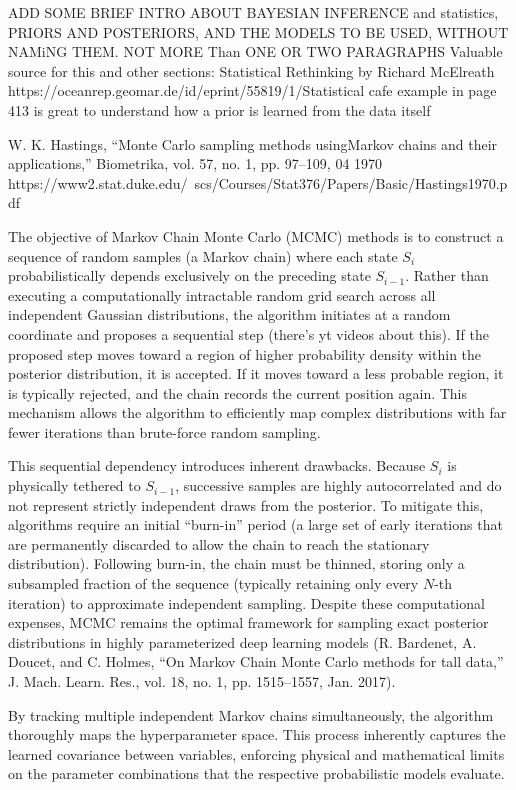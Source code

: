 \iffalse
ADD SOME BRIEF INTRO ABOUT BAYESIAN INFERENCE and statistics, PRIORS AND POSTERIORS, AND THE MODELS TO BE USED, WITHOUT NAMiNG THEM. NOT MORE Than ONE OR TWO PARAGRAPHS
Valuable source for this and other sections: Statistical Rethinking by Richard McElreath https://oceanrep.geomar.de/id/eprint/55819/1/Statistical%
cafe example in page 413 is great to understand how a prior is learned from the data itself


W. K. Hastings, “Monte Carlo sampling methods usingMarkov chains and their applications,” Biometrika, vol. 57, no. 1, pp. 97–109, 04 1970 https://www2.stat.duke.edu/~scs/Courses/Stat376/Papers/Basic/Hastings1970.pdf


The objective of Markov Chain Monte Carlo (MCMC) methods is to construct a sequence of random samples (a Markov chain) where each state $S_i$ probabilistically depends exclusively on the preceding state $S_{i-1}$. Rather than executing a computationally intractable random grid search across all independent Gaussian distributions, the algorithm initiates at a random coordinate and proposes a sequential step (there's yt videos about this). If the proposed step moves toward a region of higher probability density within the posterior distribution, it is accepted. If it moves toward a less probable region, it is typically rejected, and the chain records the current position again. This mechanism allows the algorithm to efficiently map complex distributions with far fewer iterations than brute-force random sampling.

This sequential dependency introduces inherent drawbacks. Because $S_i$ is physically tethered to $S_{i-1}$, successive samples are highly autocorrelated and do not represent strictly independent draws from the posterior. To mitigate this, algorithms require an initial ``burn-in'' period (a large set of early iterations that are permanently discarded to allow the chain to reach the stationary distribution). Following burn-in, the chain must be thinned, storing only a subsampled fraction of the sequence (typically retaining only every $N$-th iteration) to approximate independent sampling. Despite these computational expenses, MCMC remains the optimal framework for sampling exact posterior distributions in highly parameterized deep learning models (R. Bardenet, A. Doucet, and C. Holmes, ``On Markov Chain Monte Carlo methods for tall data,'' J. Mach. Learn. Res., vol. 18, no. 1, pp. 1515–1557, Jan. 2017).

By tracking multiple independent Markov chains simultaneously, the algorithm thoroughly maps the hyperparameter space. This process inherently captures the learned covariance between variables, enforcing physical and mathematical limits on the parameter combinations that the respective probabilistic models evaluate.

